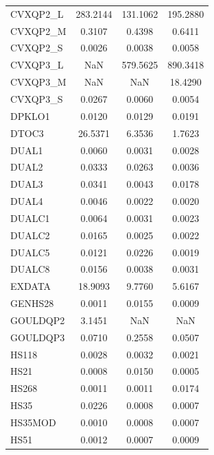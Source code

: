 \begin{longtable}{lccc}
CVXQP2\_L &      283.2144 &      131.1062 &      195.2880 \\
CVXQP2\_M &        0.3107 &        0.4398 &        0.6411 \\
CVXQP2\_S &        0.0026 &        0.0038 &        0.0058 \\
CVXQP3\_L &           NaN &      579.5625 &      890.3418 \\
CVXQP3\_M &           NaN &           NaN &       18.4290 \\
CVXQP3\_S &        0.0267 &        0.0060 &        0.0054 \\
DPKLO1   &        0.0120 &        0.0129 &        0.0191 \\
DTOC3    &       26.5371 &        6.3536 &        1.7623 \\
DUAL1    &        0.0060 &        0.0031 &        0.0028 \\
DUAL2    &        0.0333 &        0.0263 &        0.0036 \\
DUAL3    &        0.0341 &        0.0043 &        0.0178 \\
DUAL4    &        0.0046 &        0.0022 &        0.0020 \\
DUALC1   &        0.0064 &        0.0031 &        0.0023 \\
DUALC2   &        0.0165 &        0.0025 &        0.0022 \\
DUALC5   &        0.0121 &        0.0226 &        0.0019 \\
DUALC8   &        0.0156 &        0.0038 &        0.0031 \\
EXDATA   &       18.9093 &        9.7760 &        5.6167 \\
GENHS28  &        0.0011 &        0.0155 &        0.0009 \\
GOULDQP2 &        3.1451 &           NaN &           NaN \\
GOULDQP3 &        0.0710 &        0.2558 &        0.0507 \\
HS118    &        0.0028 &        0.0032 &        0.0021 \\
HS21     &        0.0008 &        0.0150 &        0.0005 \\
HS268    &        0.0011 &        0.0011 &        0.0174 \\
HS35     &        0.0226 &        0.0008 &        0.0007 \\
HS35MOD  &        0.0010 &        0.0008 &        0.0007 \\
HS51     &        0.0012 &        0.0007 &        0.0009 \\

\end{longtable}
